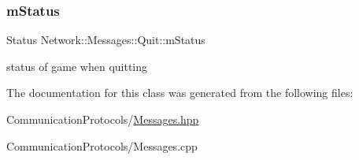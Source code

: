 \subsubsection{\texorpdfstring{m\+Status}{mStatus}}
{\footnotesize\ttfamily Status Network\+::\+Messages\+::\+Quit\+::m\+Status}

status of game when quitting 

The documentation for this class was generated from the following files\+:\begin{DoxyCompactItemize}
\item 
Communication\+Protocols/\hyperlink{_messages_8hpp}{Messages.\+hpp}\item 
Communication\+Protocols/Messages.\+cpp\end{DoxyCompactItemize}
